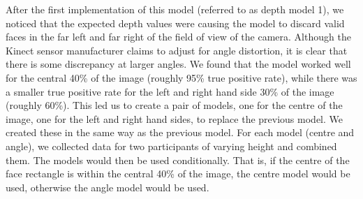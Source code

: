 \documentclass[conference]{IEEEtran}
\begin{document}
After the first implementation of this model (referred to as depth model 1), we noticed that the expected depth values were causing the model to discard valid faces in the far left and far right of the field of view of the camera. Although the Kinect sensor manufacturer claims to adjust for angle distortion, it is clear that there is some discrepancy at larger angles. We found that the model worked well for the central 40\% of the image (roughly 95\% true positive rate), while there was a smaller true positive rate for the left and right hand side 30\% of the image (roughly 60\%). This led us to create a pair of models, one for the centre of the image, one for the left and right hand sides, to replace the previous model. We created these in the same way as the previous model. For each model (centre and angle), we collected data for two participants of varying height and combined them. The models would then be used conditionally. That is, if the centre of the face rectangle is within the central 40\% of the image, the centre model would be used, otherwise the angle model would be used.
\end{document}
